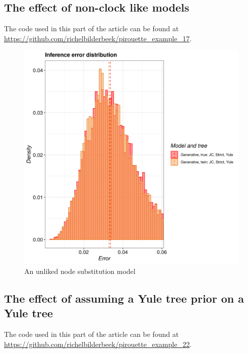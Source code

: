 \subsection{The effect of non-clock like models}

The code used in this part of the article can be found at 
\url{https://github.com/richelbilderbeek/pirouette_example_17}.

\begin{figure}[H]
  \includegraphics[width=\textwidth]{pirouette_example_17/example_17_314/errors.png}
  \caption{An unliked node substitution model}
\end{figure}

\subsection{The effect of assuming a Yule tree prior on a Yule tree}

The code used in this part of the article can be found at 
\url{https://github.com/richelbilderbeek/pirouette_example_22}.

